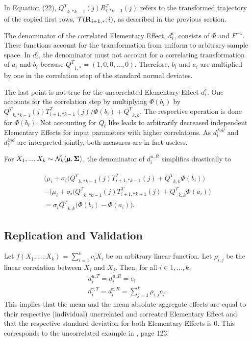\documentclass[a4paper,12pt]{article}
\begin{document}
\noindent
In Equation (22), ${Q^T}_{k,*k-1}(j)R_{i,*k-1}^T(j)$ refers to the transformed trajectory of the copied first rows, $\mathcal{T}(\bold{R_{i+1,*}}; i)$, as described in the previous section.

The denominator of the correlated Elementary Effect, $d_i^{c}$, consists of $\Phi$ and $F^{-1}$. These functions account for the transformation from uniform to arbitrary sample space. In $d_i^{c}$, the denominator must not account for a correlating transformation of $a_i$ and $b_i$ because ${Q^T}_{1,*} = (1, 0, 0, ..., 0)$.  Therefore, $b_i$ and $a_i$ are multiplied by one in the correlation step of the standard normal deviates.

The last point is not true for the uncorrelated Elementary Effect $d_i^{c}$. One accounts for the correlation step by multiplying $\Phi(b_i)$ by ${Q^T}_{k,*k-1}(j)T_{i+1,*k-1}^T(j)/\Phi(b_i)+{Q^T}_{k,k}$. The respective operation is done for $\Phi(b_i)$. Not accounting for $Q_t$ like \cite{ge2017extending} leads to arbitrarily decreased independent Elementary Effects for input parameters with higher correlations. As $d_i^{full}$ and $d_i^{ind}$ are interpreted jointly, both measures are in fact useless.

For $X_1, ..., X_k \sim \mathcal{N}_k(\pmb{\mu}, \bold{\Sigma})$, the denominator of $d_i^{u, R}$ simplifies drastically to

\begin{align}
\begin{split}
 \big(\mu_i + \sigma_i\big({Q^T}_{k,*k-1}(j)T_{i+1,*k-1}^T(j) + {Q^T}_{k,k} \Phi(b_i)\big) \\-  \big(\mu_i + \sigma_i\big({Q^T}_{k,*k-1}(j)T_{i+1,*k-1}^T(j) + {Q^T}_{k,k} \Phi(a_i)\big)\\= \sigma_i{Q^T}_{k,k}\big(\Phi(b_i)-\Phi(a_i)\big).
 \end{split}
\end{align}

\subsection{Replication and Validation}

Let $f(X_1, ..., X_k)$ = $\sum_{i = 1}^{k} c_i X_i$ be an arbitrary linear function. Let $\rho_{i,j}$ be the linear correlation between $X_i$ and $X_j$. Then, for all $i \in 1, ..., k$,
\begin{align}
d_i^{u,T} = d_i^{u,R} = c_i \\
d_i^{c,T} = d_i^{c,R} = \sum_{j = 1}^{k} \rho_{i,j} c_{j}.
\end{align}
This implies that the mean and the mean absolute aggregate effects are equal to their respective (individual) uncrrelated and correated Elementary Effect and that the respective standard deviation for both Elementary Effects is 0. This corresponds to the uncorrelated example in \cite{Saltelli.2008}, page 123.
\end{document}
